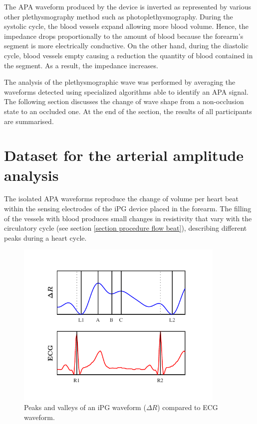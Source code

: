 The APA waveform produced by the device is inverted as represented by various other plethysmography method such as photoplethysmography. During the systolic cycle, the blood vessels expand allowing more blood volume. Hence, the impedance drops proportionally to the amount of blood because the forearm's segment is more electrically conductive. On the other hand, during the diastolic cycle, blood vessels empty causing a reduction the quantity of blood contained in the segment. As a result, the impedance increases.

The analysis of the plethysmographic wave was performed by averaging the waveforms detected using specialized algorithms able to identify an APA signal. The following section discusses the change of wave shape from a non-occlusion state to an occluded one. At the end of the section, the results of all participants are summarised.

\section{Dataset for the arterial amplitude analysis}
\label{section apa 1}
The isolated APA waveforms reproduce the change of volume per heart beat within the sensing electrodes of the iPG device placed in the forearm. The filling of the vessels with blood produces small changes in resistivity that vary with the circulatory cycle (see section \ref{section procedure flow beat}), describing different peaks during a heart cycle.

\begin{figure}[!htpb]
	\centering
	\includegraphics[width=10cm,keepaspectratio]{figure_apa_1}
	\caption[Marker ppoints in an iPG waveform]{Peaks and valleys of an iPG waveform ($\Delta R$) compared to ECG waveform.}
	\label{fig:markers iPG}
\end{figure}

